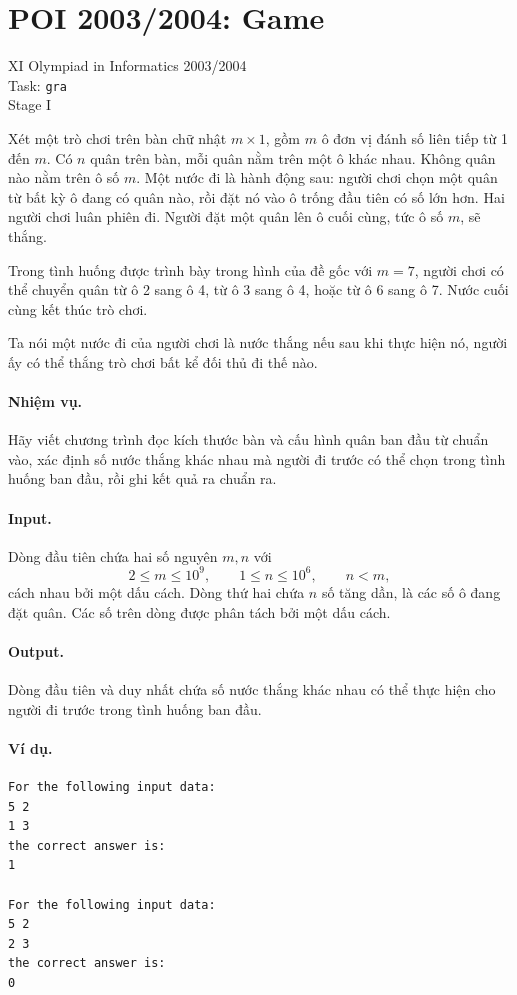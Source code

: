 \documentclass[11pt]{article}
\begin{document}
\section{POI 2003/2004: Game}

\begin{center}
XI Olympiad in Informatics 2003/2004\\
Task: \texttt{gra}\\
Stage I
\end{center}

Xét một trò chơi trên bàn chữ nhật \(m\times 1\), gồm \(m\) ô đơn vị đánh số
liên tiếp từ 1 đến \(m\). Có \(n\) quân trên bàn, mỗi quân nằm trên một ô khác
nhau. Không quân nào nằm trên ô số \(m\). Một nước đi là hành động sau: người
chơi chọn một quân từ bất kỳ ô đang có quân nào, rồi đặt nó vào ô trống đầu
tiên có số lớn hơn. Hai người chơi luân phiên đi. Người đặt một quân lên ô cuối
cùng, tức ô số \(m\), sẽ thắng.

Trong tình huống được trình bày trong hình của đề gốc với \(m=7\), người chơi
có thể chuyển quân từ ô 2 sang ô 4, từ ô 3 sang ô 4, hoặc từ ô 6 sang ô 7.
Nước cuối cùng kết thúc trò chơi.

Ta nói một nước đi của người chơi là nước thắng nếu sau khi thực hiện nó, người
ấy có thể thắng trò chơi bất kể đối thủ đi thế nào.

\paragraph{Nhiệm vụ.}
Hãy viết chương trình đọc kích thước bàn và cấu hình quân ban đầu từ chuẩn vào,
xác định số nước thắng khác nhau mà người đi trước có thể chọn trong tình huống
ban đầu, rồi ghi kết quả ra chuẩn ra.

\paragraph{Input.}
Dòng đầu tiên chứa hai số nguyên \(m,n\) với
\[
  2\le m\le 10^9,\qquad 1\le n\le 10^6,\qquad n<m,
\]
cách nhau bởi một dấu cách. Dòng thứ hai chứa \(n\) số tăng dần, là các số ô
đang đặt quân. Các số trên dòng được phân tách bởi một dấu cách.

\paragraph{Output.}
Dòng đầu tiên và duy nhất chứa số nước thắng khác nhau có thể thực hiện cho
người đi trước trong tình huống ban đầu.

\paragraph{Ví dụ.}
\begin{verbatim}
For the following input data:
5 2
1 3
the correct answer is:
1

For the following input data:
5 2
2 3
the correct answer is:
0
\end{verbatim}
\end{document}
